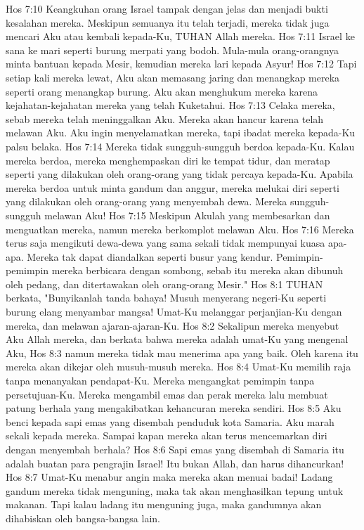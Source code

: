 Hos 7:10  Keangkuhan orang Israel tampak dengan jelas dan menjadi bukti kesalahan mereka. Meskipun semuanya itu telah terjadi, mereka tidak juga mencari Aku atau kembali kepada-Ku, TUHAN Allah mereka.
Hos 7:11  Israel ke sana ke mari seperti burung merpati yang bodoh. Mula-mula orang-orangnya minta bantuan kepada Mesir, kemudian mereka lari kepada Asyur!
Hos 7:12  Tapi setiap kali mereka lewat, Aku akan memasang jaring dan menangkap mereka seperti orang menangkap burung. Aku akan menghukum mereka karena kejahatan-kejahatan mereka yang telah Kuketahui.
Hos 7:13  Celaka mereka, sebab mereka telah meninggalkan Aku. Mereka akan hancur karena telah melawan Aku. Aku ingin menyelamatkan mereka, tapi ibadat mereka kepada-Ku palsu belaka.
Hos 7:14  Mereka tidak sungguh-sungguh berdoa kepada-Ku. Kalau mereka berdoa, mereka menghempaskan diri ke tempat tidur, dan meratap seperti yang dilakukan oleh orang-orang yang tidak percaya kepada-Ku. Apabila mereka berdoa untuk minta gandum dan anggur, mereka melukai diri seperti yang dilakukan oleh orang-orang yang menyembah dewa. Mereka sungguh-sungguh melawan Aku!
Hos 7:15  Meskipun Akulah yang membesarkan dan menguatkan mereka, namun mereka berkomplot melawan Aku.
Hos 7:16  Mereka terus saja mengikuti dewa-dewa yang sama sekali tidak mempunyai kuasa apa-apa. Mereka tak dapat diandalkan seperti busur yang kendur. Pemimpin-pemimpin mereka berbicara dengan sombong, sebab itu mereka akan dibunuh oleh pedang, dan ditertawakan oleh orang-orang Mesir."
Hos 8:1  TUHAN berkata, "Bunyikanlah tanda bahaya! Musuh menyerang negeri-Ku seperti burung elang menyambar mangsa! Umat-Ku melanggar perjanjian-Ku dengan mereka, dan melawan ajaran-ajaran-Ku.
Hos 8:2  Sekalipun mereka menyebut Aku Allah mereka, dan berkata bahwa mereka adalah umat-Ku yang mengenal Aku,
Hos 8:3  namun mereka tidak mau menerima apa yang baik. Oleh karena itu mereka akan dikejar oleh musuh-musuh mereka.
Hos 8:4  Umat-Ku memilih raja tanpa menanyakan pendapat-Ku. Mereka mengangkat pemimpin tanpa persetujuan-Ku. Mereka mengambil emas dan perak mereka lalu membuat patung berhala yang mengakibatkan kehancuran mereka sendiri.
Hos 8:5  Aku benci kepada sapi emas yang disembah penduduk kota Samaria. Aku marah sekali kepada mereka. Sampai kapan mereka akan terus mencemarkan diri dengan menyembah berhala?
Hos 8:6  Sapi emas yang disembah di Samaria itu adalah buatan para pengrajin Israel! Itu bukan Allah, dan harus dihancurkan!
Hos 8:7  Umat-Ku menabur angin maka mereka akan menuai badai! Ladang gandum mereka tidak menguning, maka tak akan menghasilkan tepung untuk makanan. Tapi kalau ladang itu menguning juga, maka gandumnya akan dihabiskan oleh bangsa-bangsa lain.
